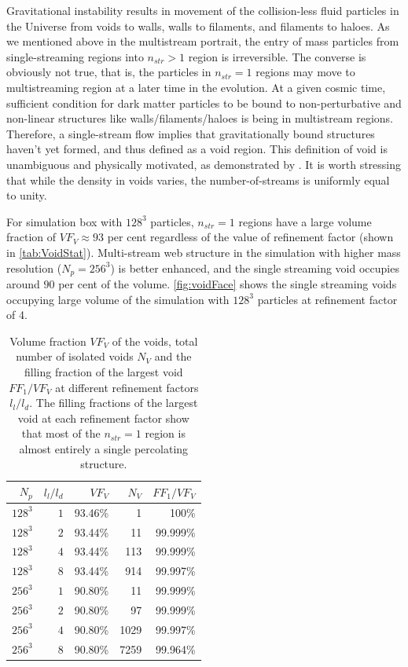 Gravitational instability results in movement of the collision-less fluid particles in the Universe from voids to walls, walls to filaments, and filaments to haloes. As we mentioned above in the multistream portrait, the entry of mass particles from single-streaming regions into $n_{str} > 1$ region is irreversible. The converse is obviously not true, that is, the particles in $n_{str} = 1$ regions may move to multistreaming region at a later time in the evolution. At a given cosmic time, sufficient condition for dark matter particles to be bound to non-perturbative and non-linear structures like walls/filaments/haloes is being in multistream regions. Therefore, a single-stream flow implies that gravitationally bound structures haven't yet formed, and thus defined as a void region. This definition of void is unambiguous and physically motivated, as demonstrated by \cite{Shandarin2012}. It is worth stressing that while the density in voids varies, the number-of-streams is uniformly equal to unity.


For simulation box with $128^3$ particles, $n_{str} = 1$ regions have a large volume fraction of $VF_V \approx 93$ per cent regardless of the value of refinement factor (shown in \autoref{tab:VoidStat}). Multi-stream web structure in the simulation with higher mass resolution ($N_p = 256^3$) is better enhanced, and the single streaming void occupies around $90$ per cent of the volume. \autoref{fig:voidFace} shows the single streaming voids occupying large volume of the simulation with $128^3$ particles at refinement factor of 4. 

\begin{table}
\centering
  \caption{Volume fraction $VF_V$ of the voids, total number of isolated voids $N_V$ and the filling fraction of the largest void  $FF_1/VF_V$ at different refinement factors $l_l/l_d$. The filling fractions of the largest void at each refinement factor show that most of the $n_{str} = 1 $ region is almost entirely a single percolating structure.}
\begin{tabular}{|r|r|r|r|r| }
\hline
$N_p$ & $l_l/l_d$ & $VF_V$ & $N_V$ & $FF_1/VF_V$  \\  \hline
$ 128^3$      & $ 1$      & 93.46\%   & 1    & 100\% \\ \hline
$ 128^3$      & $ 2$      & 93.44\%   & 11   & 99.999\% \\ \hline
$ 128^3$      & $ 4$      & 93.44\%   & 113  & 99.999\% \\ \hline
$ 128^3$      & $ 8$      & 93.44\%   & 914  & 99.997\% \\ \hline
$ 256^3$      & $ 1$      & 90.80\%   & 11   & 99.999\% \\ \hline
$ 256^3$      & $ 2$      & 90.80\%   & 97   & 99.999\% \\ \hline
$ 256^3$      & $ 4$      & 90.80\%   & 1029 & 99.997\% \\ \hline
$ 256^3$      & $ 8$      & 90.80\%   & 7259 & 99.964\% \\ \hline

\end{tabular}
\label{tab:VoidStat}
\end{table}



